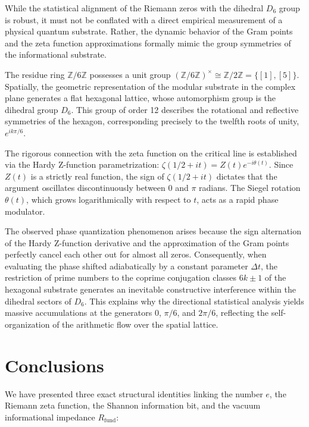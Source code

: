 \documentclass[10pt,a4paper]{article}
\newcommand{\Rfund}{R_{\text{fund}}}
\begin{document}
While the statistical alignment of the Riemann zeros with the dihedral \(D_6\) group is robust, it must not be conflated with a direct empirical measurement of a physical quantum substrate. Rather, the dynamic behavior of the Gram points and the zeta function approximations formally mimic the group symmetries of the informational substrate.

The residue ring \(\mathbb{Z}/6\mathbb{Z}\) possesses a unit group \((\mathbb{Z}/6\mathbb{Z})^\times \cong \mathbb{Z}/2\mathbb{Z} = \{[1], [5]\}\). Spatially, the geometric representation of the modular substrate in the complex plane generates a flat hexagonal lattice, whose automorphism group is the dihedral group \(D_6\). This group of order 12 describes the rotational and reflective symmetries of the hexagon, corresponding precisely to the twelfth roots of unity, \(e^{ik\pi/6}\).

The rigorous connection with the zeta function on the critical line is established via the Hardy Z-function parametrization: \(\zeta(1/2 + it) = Z(t) e^{-i\theta(t)}\).
Since \(Z(t)\) is a strictly real function, the sign of \(\zeta(1/2+it)\) dictates that the argument oscillates discontinuously between \(0\) and \(\pi\) radians. The Siegel rotation \(\theta(t)\), which grows logarithmically with respect to \(t\), acts as a rapid phase modulator.

The observed phase quantization phenomenon arises because the sign alternation of the Hardy Z-function derivative and the approximation of the Gram points perfectly cancel each other out for almost all zeros. Consequently, when evaluating the phase shifted adiabatically by a constant parameter \(\Delta t\), the restriction of prime numbers to the coprime conjugation classes \(6k \pm 1\) of the hexagonal substrate generates an inevitable constructive interference within the dihedral sectors of \(D_6\). This explains why the directional statistical analysis yields massive accumulations at the generators \(0\), \(\pi/6\), and \(2\pi/6\), reflecting the self-organization of the arithmetic flow over the spatial lattice.

\section{Conclusions}
\label{sec:conclusiones}

We have presented three exact structural identities linking the number \(e\), the Riemann zeta function, the Shannon information bit, and the vacuum informational impedance \(\Rfund\):
\end{document}
